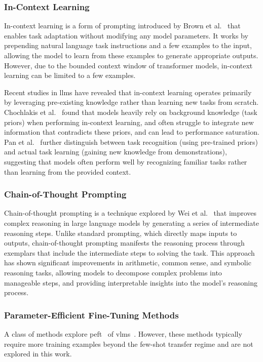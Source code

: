 \documentclass[../ShajiS_RnDReport.tex]{subfiles}
\begin{document}
\subsubsection{In-Context Learning}
In-context learning is a form of prompting introduced by Brown et al.~\cite{Brown2020} that enables task adaptation without modifying any model parameters. It works by prepending natural language task instructions and a few examples to the input, allowing the model to learn from these examples to generate appropriate outputs. However, due to the bounded context window of transformer models, in-context learning can be limited to a few examples.

Recent studies in \glspl{llm} have revealed that in-context learning operates primarily by leveraging pre-existing knowledge rather than learning new tasks from scratch. Chochlakis et al.~\cite{Chochlakis2024} found that models heavily rely on background knowledge (task priors) when performing in-context learning, and often struggle to integrate new information that contradicts these priors, and can lead to performance saturation. Pan et al.~\cite{Pan2023} further distinguish between task recognition (using pre-trained priors) and actual task learning (gaining new knowledge from demonstrations), suggesting that models often perform well by recognizing familiar tasks rather than learning from the provided context.

\subsubsection{Chain-of-Thought Prompting}
Chain-of-thought prompting is a technique explored by Wei et al.~\cite{Wei2022} that improves complex reasoning in large language models by generating a series of intermediate reasoning steps. Unlike standard prompting, which directly maps inputs to outputs, chain-of-thought prompting manifests the reasoning process through exemplars that include the intermediate steps to solving the task. This approach has shown significant improvements in arithmetic, common sense, and symbolic reasoning tasks, allowing models to decompose complex problems into manageable steps, and providing interpretable insights into the model's reasoning process.

\subsubsection{Parameter-Efficient Fine-Tuning Methods}
A class of methods explore \gls{peft}~\cite{Houlsby2019} of \glspl{vlm}~\cite{He2023,Han2024}. However, these methods typically require more training examples beyond the few-shot transfer regime and are not explored in this work.
\end{document}
